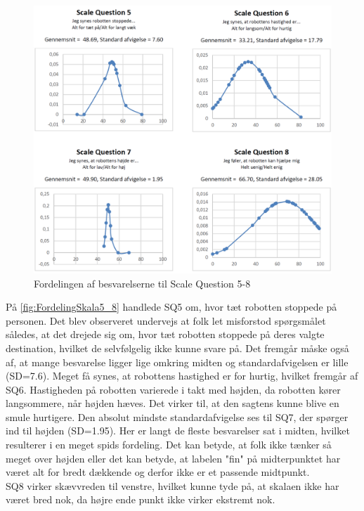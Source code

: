 \begin{figure}[H]
\centering
\includegraphics[width =\textwidth]{Figure/DatabehandlingSkalaer/FordelingSkala5_8} 
\caption{Fordelingen af besvarelserne til Scale Question 5-8}
\label{fig:FordelingSkala5_8}
\end{figure}
\noindent

På \autoref{fig:FordelingSkala5_8} handlede SQ5 om, hvor tæt robotten stoppede på personen. Det blev observeret undervejs at folk let misforstod spørgsmålet således, at det drejede sig om, hvor tæt robotten stoppede på deres valgte destination, hvilket de selvfølgelig ikke kunne svare på. Det fremgår måske også af, at mange besvarelse ligger lige omkring midten og standardafvigelsen er lille (SD=7.6). Meget få synes, at robottens hastighed er for hurtig, hvilket fremgår af SQ6.  Hastigheden på robotten varierede i takt med højden, da robotten kører langsommere, når højden hæves. Det virker til, at den sagtens kunne blive en smule hurtigere. Den absolut mindste standardafvigelse ses til SQ7, der spørger ind til højden (SD=1.95). Her er langt de fleste besvarelser sat i midten, hvilket resulterer i en meget spids fordeling. Det kan betyde, at folk ikke tænker så meget over højden eller det kan betyde, at labelen "fin" på midterpunktet har været alt for bredt dækkende og derfor ikke er et passende midtpunkt.\\
SQ8 virker skævvreden til venstre, hvilket kunne tyde på, at skalaen ikke har været bred nok, da højre ende punkt ikke virker ekstremt nok.

